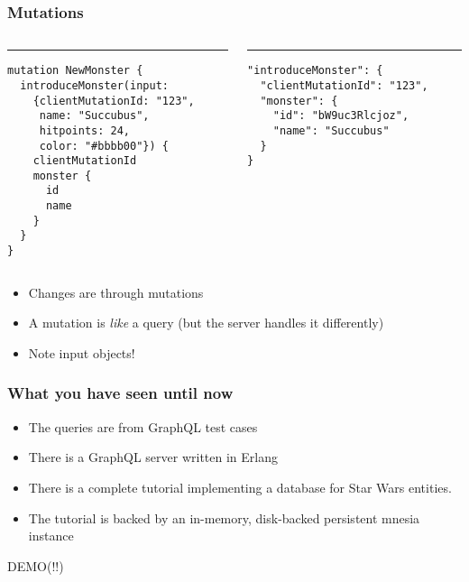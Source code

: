 \documentclass[lualatex]{beamer}
\begin{document}
\begin{frame}[fragile]
  \frametitle{Mutations}
\begin{columns}[T] %
\begin{column}{.5\textwidth}
\color{black}\rule{\linewidth}{1pt}
\begin{verbatim}
mutation NewMonster {
  introduceMonster(input:
    {clientMutationId: "123",
     name: "Succubus",
     hitpoints: 24,
     color: "#bbbb00"}) {
    clientMutationId
    monster {
      id
      name
    }
  }
}
\end{verbatim}
\end{column}
\hfill
\begin{column}{.5\textwidth}
\color{gray}\rule{\linewidth}{1pt}
\begin{verbatim}
"introduceMonster": {
  "clientMutationId": "123",
  "monster": {
    "id": "bW9uc3Rlcjoz",
    "name": "Succubus"
  }
}
\end{verbatim}
\end{column}
\end{columns}
\begin{itemize}
\item Changes are through mutations
\item A mutation is \emph{like} a query (but the server handles it differently)
\item Note input objects!
\end{itemize}
\end{frame}

\begin{frame}
  \frametitle{What you have seen until now}
  \begin{itemize}
  \item The queries are from GraphQL test cases
  \item There is a GraphQL server written in Erlang
  \item There is a complete tutorial implementing a database for Star
    Wars\texttrademark{} entities.
  \item The tutorial is backed by an in-memory, disk-backed persistent
    mnesia instance
  \end{itemize}
\end{frame}

\begin{frame}
  DEMO(!!)
\end{frame}
\end{document}
